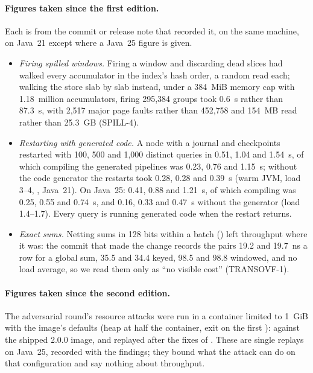 \documentclass[11pt,a4paper]{article}
\renewcommand{\_}{\oldunderscore\allowbreak}
\newcommand{\cls}[1]{\texttt{\pvbreakable{#1}}}
\newcommand{\code}[1]{\texttt{\pvbreakable{#1}}}
\begin{document}
\paragraph{Figures taken since the first edition.} Each is from the commit or release note that
recorded it, on the same machine, on Java~21 except where a Java~25 figure is given.
\begin{itemize}[leftmargin=*,itemsep=2pt]
\item \emph{Firing spilled windows.} Firing a window and discarding dead slices had walked every
      accumulator in the index's hash order, a random read each; walking the store slab by slab instead,
      under a 384~MiB memory cap with 1.18~million accumulators, firing 295{,}384 groups took 0.6~s rather
      than 87.3~s, with 2{,}517 major page faults rather than 452{,}758 and 154~MB read rather than 25.3~GB
      (SPILL-4).
\item \emph{Restarting with generated code.} A node with a journal and checkpoints restarted with 100, 500
      and 1{,}000 distinct queries in 0.51, 1.04 and 1.54~s, of which compiling the generated pipelines was
      0.23, 0.76 and 1.15~s; without the code generator the restarts took 0.28, 0.28 and 0.39~s (warm JVM,
      load 3--4, \cls{RestartCompileIT}, Java~21). On Java~25: 0.41, 0.88 and 1.21~s, of which compiling
      was 0.25, 0.55 and 0.74~s, and 0.16, 0.33 and 0.47~s without the generator (load 1.4--1.7). Every query is running generated code when the restart returns.
\item \emph{Exact sums.} Netting sums in 128 bits within a batch () left throughput
      where it was: the commit that made the change records the pairs 19.2 and 19.7~ns a row for a
      global sum, 35.5 and 34.4 keyed, 98.5 and 98.8 windowed, and no load average, so we read them only
      as ``no visible cost'' (TRANSOVF-1).
\end{itemize}

\paragraph{Figures taken since the second edition.} The adversarial round's resource attacks were run in a
container limited to 1~GiB with the image's defaults (heap at half the container, exit on the first
\code{OutOfMemoryError}): against the shipped 2.0.0 image, and replayed after the fixes of
.
These are single replays on Java~25, recorded with the findings; they bound what the attack can do on that
configuration and say nothing about throughput.
\end{document}
